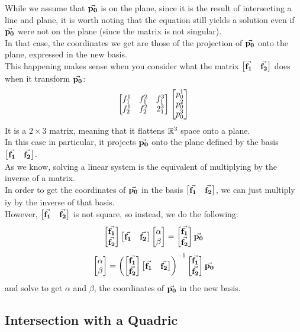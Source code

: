 \documentclass[12pt]{article}
\begin{document}
While we assume that $\vec{\mathbf{p_0}}$ is on the plane,
since it is the result of intersecting a line
and plane,
it is worth noting that the equation still yields
a solution even if $\vec{\mathbf{p_0}}$ were not on the plane
(since the matrix is not singular). \\
In that case, the coordinates we get are those
of the projection of $\vec{\mathbf{p_0}}$ onto the plane,
expressed in the new basis. \\

This happening makes sense when you consider
what the matrix
$\begin{bmatrix} {\vec{\mathbf{f_1}}} & {\vec{\mathbf{f_2}}} \end{bmatrix}$
does when it transform $\vec{\mathbf{p_0}}$:
\[ \begin{bmatrix}
    f_1^1 & f_1^2 & f_1^3 \\
    f_2^1 & f_2^2 & 2_1^3
\end{bmatrix} \begin{bmatrix} {p_0^1}\\{p_0^2}\\{p_0^3} \end{bmatrix} \]
It is a $2 \times 3$ matrix,
meaning that it flattens $\mathbb{R}^3$
space onto a plane. \\
In this case in particular,
it projects $\vec{\mathbf{p_0}}$ onto the plane
defined by the basis
$\begin{bmatrix} {\vec{\mathbf{f_1}}} & {\vec{\mathbf{f_2}}} \end{bmatrix}$. \\

As we know, solving a linear system
is the equivalent of multiplying by the inverse
of a matrix. \\
In order to get the coordinates of $\vec{\mathbf{p_0}}$
in the basis $\begin{bmatrix} {\vec{\mathbf{f_1}}} & {\vec{\mathbf{f_2}}} \end{bmatrix}$,
we can just multiply iy by the inverse
of that basis. \\
However, $\begin{bmatrix} {\vec{\mathbf{f_1}}} & {\vec{\mathbf{f_2}}} \end{bmatrix}$
is not square, so instead, we do the following:
\[ \begin{bmatrix} {\vec{\mathbf{f_1}}} \\ {\vec{\mathbf{f_2}}} \end{bmatrix}
\begin{bmatrix} {\vec{\mathbf{f_1}}} & {\vec{\mathbf{f_2}}} \end{bmatrix}
\begin{bmatrix} {\alpha}\\{\beta} \end{bmatrix}
= \begin{bmatrix} {\vec{\mathbf{f_1}}}\\{\vec{\mathbf{f_2}}} \end{bmatrix}\vec{\mathbf{p_0}} \]
\[ \begin{bmatrix} {\alpha} \\ {\beta} \end{bmatrix}
= \left( \begin{bmatrix} {\vec{\mathbf{f_1}}}\\{\vec{\mathbf{f_2}}} \end{bmatrix}
\begin{bmatrix} {\vec{\mathbf{f_1}}}&{\vec{\mathbf{f_2}}} \end{bmatrix} \right)^{-1}
\begin{bmatrix} {\vec{\mathbf{f_1}}} \\ {\vec{\mathbf{f_2}}} \end{bmatrix}\vec{\mathbf{p_0}} \]
and solve to get $\alpha$ and $\beta$,
the coordinates of $\vec{\mathbf{p_0}}$
in the new basis. \\

\newpage

\subsection*{Intersection with a Quadric}
\end{document}
